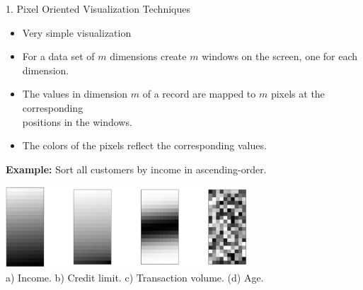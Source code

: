 \begin{frame}{1. Pixel Oriented Visualization Techniques}
  \vspace*{-0.5em}

  \begin{itemize}
    \item Very simple visualization
  \item For a data set of $m$ dimensions create $m$ windows on the screen, one for each dimension.
  \item The values in dimension $m$ of a record are mapped to $m$ pixels at the corresponding \\ positions in the windows.
  \item The colors of the pixels reflect the corresponding values.
  \end{itemize}

  \vspace*{0.5em}
  \textbf{Example:} Sort all customers by income in ascending-order.

  \begin{center}
    \includegraphics[width=9cm]{img/pixel.jpg}\\
    \vspace*{-0.5em}
    a) Income. \hspace{0.3cm} b) Credit limit. \hspace{0.1cm} c) Transaction volume. \hspace{0.2cm} (d) Age.
  \end{center}

\end{frame}

